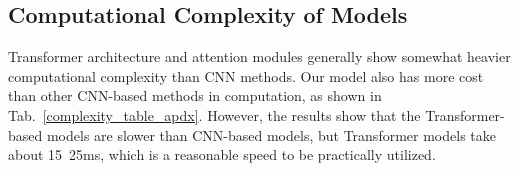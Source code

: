\documentclass[letterpaper]{article} \usepackage{aaai23}  \usepackage{times}  \usepackage{helvet}  \usepackage{courier}  \usepackage[hyphens]{url}  \usepackage{graphicx} \urlstyle{rm} \def\UrlFont{\rm}  \usepackage{natbib}  \usepackage{caption} \frenchspacing  \setlength{\pdfpagewidth}{8.5in} \setlength{\pdfpageheight}{11in} \usepackage{algorithm}
\newcommand{\tabref}[1]{Tab.~\ref{#1}}
\begin{document}
\subsection{Computational Complexity of Models}
Transformer architecture and attention modules generally show somewhat heavier computational complexity than CNN methods. Our model also has more cost than other CNN-based methods in computation, as shown in \tabref{complexity_table_apdx}. However, the results show that the Transformer-based models are slower than CNN-based models, but Transformer models take about 15~25ms, which is a reasonable speed to be practically utilized. 

\begin{table}[h]
\centering
{}
\caption{\textbf{Complexitytable of models.} All results are tested on a single A6000 GPU with an input image size of $640 \times 192$}
\label{complexity_table_apdx}
\vspace{-0.3cm}
\end{table}
\end{document}
